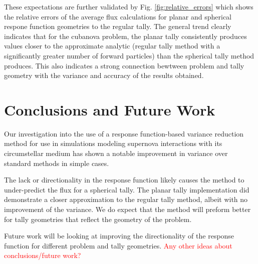 \documentclass[]{article}
\begin{document}
		These expectations are further validated by Fig. \ref{fig:relative_errors} which shows the relative errors of the average flux calculations for planar and spherical respone function geometries to the regular tally. The general trend clearly indicates that for the cubanova problem, the planar tally consistently produces values closer to the approximate analytic (regular tally method with a significantly greater number of forward particles) than the spherical tally method produces. This also indicates a strong connection bewtween problem and tally geometry with the variance and accuracy of the results obtained. 

\section{Conclusions and Future Work}
Our investigation into the use of a response function-based variance reduction method for use in simulations modeling supernova interactions with its circumstellar medium has shown a notable improvement in variance over standard methods in simple cases. 

The lack or directionality in the response function likely causes the method to under-predict the flux for a spherical tally. The planar tally implementation did demonstrate a closer approximation to the regular tally method, albeit with no improvement of the variance. We do expect that the method will preform better for tally geometries that reflect the geometry of the problem.

Future work will be looking at improving the directionality of the response function for different problem and tally geometries.
\textcolor{red}{Any other ideas about conclusions/future work?}

\newpage



\end{document}
